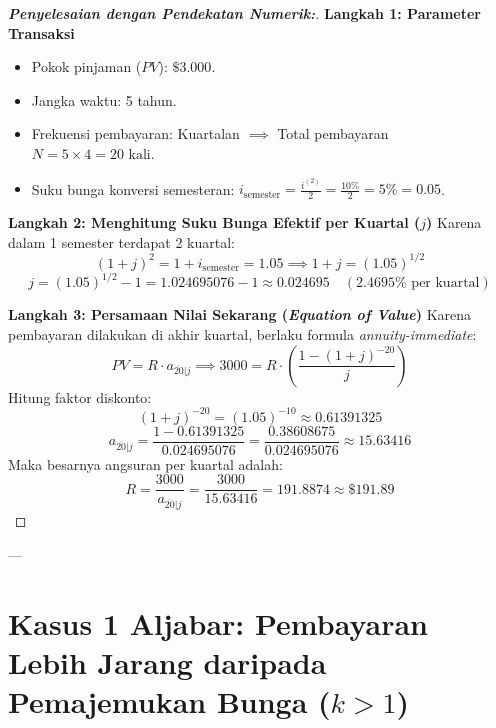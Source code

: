 \documentclass[11pt,a4paper]{article}
\begin{document}
\begin{proof}[\textbf{Penyelesaian dengan Pendekatan Numerik:}]
\textbf{Langkah 1: Parameter Transaksi}
\begin{itemize}
    \item Pokok pinjaman ($PV$): $\$3.000$.
    \item Jangka waktu: 5 tahun.
    \item Frekuensi pembayaran: Kuartalan $\implies$ Total pembayaran $N = 5 \times 4 = 20\text{ kali}$.
    \item Suku bunga konversi semesteran: $i_{\text{semester}} = \frac{i^{(2)}}{2} = \frac{10\%}{2} = 5\% = 0.05$.
\end{itemize}

\textbf{Langkah 2: Menghitung Suku Bunga Efektif per Kuartal ($j$)}
Karena dalam 1 semester terdapat 2 kuartal:
\begin{equation*}
    (1 + j)^2 = 1 + i_{\text{semester}} = 1.05 \implies 1 + j = (1.05)^{1/2}
\end{equation*}
\begin{equation*}
    j = (1.05)^{1/2} - 1 = 1.024695076 - 1 \approx 0.024695 \quad (2.4695\%\text{ per kuartal})
\end{equation*}

\textbf{Langkah 3: Persamaan Nilai Sekarang (\textit{Equation of Value})}
Karena pembayaran dilakukan di akhir kuartal, berlaku formula \textit{annuity-immediate}:
\begin{equation*}
    PV = R \cdot a_{\overline{20}|j} \implies 3000 = R \cdot \left( \frac{1 - (1+j)^{-20}}{j} \right)
\end{equation*}
Hitung faktor diskonto:
\begin{equation*}
    (1+j)^{-20} = (1.05)^{-10} \approx 0.61391325
\end{equation*}
\begin{equation*}
    a_{\overline{20}|j} = \frac{1 - 0.61391325}{0.024695076} = \frac{0.38608675}{0.024695076} \approx 15.63416
\end{equation*}
Maka besarnya angsuran per kuartal adalah:
\begin{equation*}
    R = \frac{3000}{a_{\overline{20}|j}} = \frac{3000}{15.63416} = \mathbf{191.8874} \approx \mathbf{\$191.89}
\end{equation*}
\end{proof}

---

\section{Kasus 1 Aljabar: Pembayaran Lebih Jarang daripada Pemajemukan Bunga (\texorpdfstring{$k > 1$}{k > 1})}
\end{document}
